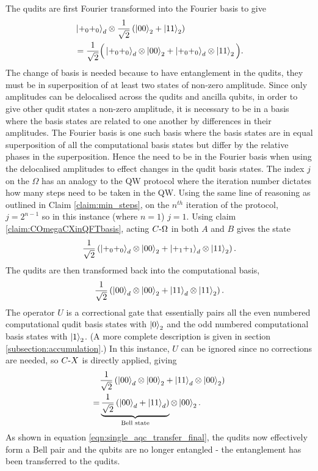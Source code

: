The qudits are first Fourier transformed into the Fourier basis to give
\begin{align}
    &\ket{+_0 +_0}_d\otimes\frac{1}{\sqrt{2}}\left(\ket{00}_2 + \ket{11}_2\right)\\
    &=\frac{1}{\sqrt{2}}\Big(
        \ket{+_0 +_0}_d \otimes \ket{00}_2
        +\ket{+_0 +_0}_d \otimes \ket{11}_2
        \Big).
\end{align}
The change of basis is needed because to have entanglement in the qudits, they must be in superposition of at least two states of non-zero amplitude.
Since only amplitudes can be delocalised across the qudits and ancilla qubits, in order to give other qudit states a non-zero amplitude, it is necessary to be in a basis where the basis states are related to one another by differences in their amplitudes.
The Fourier basis is one such basis where the basis states are in equal superposition of all the computational basis states but differ by the relative phases in the superposition.
Hence the need to be in the Fourier basis when using the delocalised amplitudes to effect changes in the qudit basis states.
The index $j$ on the $\Omega$ has an analogy to the QW protocol where the iteration number dictates how many steps need to be taken in the QW.
Using the same line of reasoning as outlined in Claim \ref{claim:min_steps}, on the $n^{th}$ iteration of the protocol, $j = 2^{n-1}$ so in this instance (where $n=1$) $j=1$.
Using claim \ref{claim:COmegaCXinQFTbasis}, acting $C\text{-}\Omega$ in both $A$ and $B$ gives the state
\begin{equation}
    \frac{1}{\sqrt{2}}\left(
        \ket{+_0 +_0}_d \otimes \ket{00}_2
        +\ket{+_1 +_1}_d \otimes \ket{11}_2
        \right).
\end{equation}
The qudits are then transformed back into the computational basis,
\begin{equation}
    \frac{1}{\sqrt{2}}\left(
        \ket{0 0}_d \otimes \ket{00}_2
        +\ket{1 1}_d \otimes \ket{11}_2
        \right).
\end{equation}
The operator $U$ is a correctional gate that essentially pairs all the even numbered computational qudit basis states with $\ket{0}_2$ and the odd numbered computational basis states with $\ket{1}_2$.
(A more complete description is given in section \ref{subsection:accumulation}.)
In this instance, $U$ can be ignored since no corrections are needed, so $C\text{-}X$ is directly applied, giving
\begin{align}
    &\frac{1}{\sqrt{2}}\left(
        \ket{00}_d \otimes \ket{00}_2
        +\ket{11}_d \otimes \ket{00}_2
        \right)\\
    =&\underbrace{
        \frac{1}{\sqrt{2}}\left(\ket{00}_d +\ket{11}_d\right)
    }_{\text{Bell state}}
    \otimes \ket{00}_2.    
    \label{eqn:single_aqc_transfer_final}
\end{align}
As shown in equation \ref{eqn:single_aqc_transfer_final}, the qudits now effectively form a Bell pair and the qubits are no longer entangled - the entanglement has been transferred to the qudits.


